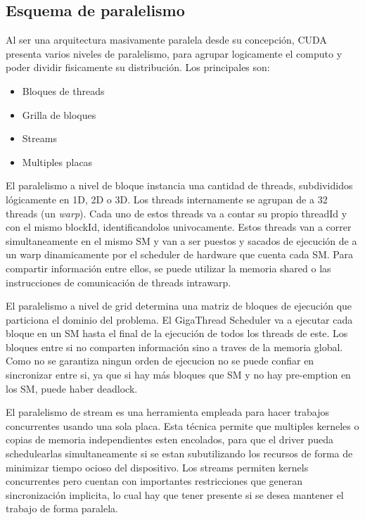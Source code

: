 \subsection{Esquema de paralelismo}
Al ser una arquitectura masivamente paralela desde su concepci\'on, CUDA presenta varios niveles de paralelismo, para
agrupar logicamente el computo y poder dividir fisicamente su distribuci\'on. Los principales son:
\begin{itemize}
  \item Bloques de threads
  \item Grilla de bloques
  \item Streams
  \item Multiples placas
\end{itemize}

El paralelismo a nivel de bloque instancia una cantidad de threads, subdivididos l\'ogicamente en 1D, 2D o 3D.
Los threads internamente se agrupan de a 32 threads (un \textit{warp}).
Cada uno de estos threads va a contar su propio threadId y con el mismo blockId, identificandolos univocamente.
Estos threads van a correr simultaneamente en el mismo SM y van a ser puestos y sacados de ejecuci\'on de a un warp
dinamicamente por el scheduler de hardware que cuenta cada SM. Para compartir informaci\'on entre
ellos, se puede utilizar la memoria shared o las instrucciones de comunicaci\'on de threads intrawarp.

El paralelismo a nivel de grid determina una matriz de bloques de ejecuci\'on que particiona
el dominio del problema. El GigaThread Scheduler va a ejecutar cada bloque en un SM hasta
el final de la ejecuci\'on de todos los threads de este. Los bloques entre si no comparten informaci\'on
sino a traves de la memoria global. Como no se garantiza ningun orden de ejecucion no se puede
confiar en sincronizar entre si, ya que si hay m\'as bloques que SM y no hay pre-emption en los SM,
puede haber deadlock.

El paralelismo de stream es una herramienta empleada para hacer trabajos concurrentes usando una
sola placa. Esta t\'ecnica permite que multiples kerneles o copias de memoria independientes esten
encolados, para que el driver pueda schedulearlas simultaneamente si se estan subutilizando
los recursos de forma de minimizar tiempo ocioso del dispositivo. Los streams permiten kernels
concurrentes pero cuentan con importantes restricciones que generan sincronizaci\'on implicita,
lo cual hay que tener presente si se desea mantener el trabajo de forma paralela.

